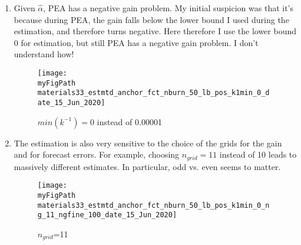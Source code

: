 \documentclass[11pt]{article}
\def \myFigPath {../../figures/}
\renewcommand{\[}{\begin{equation}}
\renewcommand{\]}{\end{equation}}
\def\myAdjustableFigScale{0.21}
\begin{document}
\begin{enumerate}
%

\clearpage
\item Given $\hat{\alpha}$, PEA has a negative gain problem. My initial suspicion was that it's because during PEA, the gain falls below the lower bound I used during the estimation, and therefore turns negative. Here therefore I use the lower bound 0 for estimation, but still PEA has a negative gain problem. I don't understand how!
\begin{figure}[h!]
\texttt{[image: \\myFigPath materials33\_estmtd\_anchor\_fct\_nburn\_50\_lb\_pos\_k1min\_0\_date\_15\_Jun\_2020]}
\caption{$min(k^{-1}) = 0$ instead of 0.00001}
\label{mink1_0}
\end{figure}

\item The estimation is also very sensitive to the choice of the grids for the gain and for forecast errors. For example, choosing $n_{grid} = 11$ instead of 10 leads to massively different estimates. In particular, odd vs. even seems to matter.
\begin{figure}[h!]
\texttt{[image: \\myFigPath materials33\_estmtd\_anchor\_fct\_nburn\_50\_lb\_pos\_k1min\_0\_ng\_11\_ngfine\_100\_date\_15\_Jun\_2020]}
\caption{$n_{grid}$=11}
\label{ng11}
\end{figure}



\end{enumerate}
\end{document}
